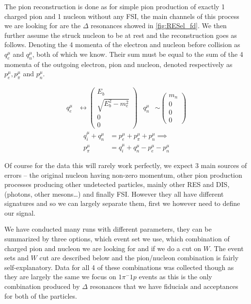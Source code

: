 \documentclass[a4paper,12pt]{article}
\begin{document}
The pion reconstruction is done as for simple pion production of exactly 1 charged pion and 1 nucleon without any FSI, the main channels of this process we are looking for are the $\Delta$ resonances showed in \cref{fig:RESel_fd}.
We then further assume the struck nucleon to be at rest and the reconstruction goes as follows.
Denoting the 4 momenta of the electron and nucleon before collision as $q_e^\mu$ and $q_n^\mu$, both of which we know.
Their sum must be equal to the sum of the 4 momenta of the outgoing electron, pion and nucleon, denoted respectively as $p_e^\mu, p_\pi^\mu$ and $p_n^\mu$.

\begin{align}\label{eq:reco_ass}
    q_e^\mu &\leftrightarrow \begin{pmatrix} E_b \\ \sqrt{E_b^2 - m_e^2} \\ 0 \\ 0 \end{pmatrix} &
    q_n^\mu &\sim \begin{pmatrix} m_n \\ 0 \\ 0 \\ 0 \end{pmatrix}
\end{align}
\begin{align}\label{eq:reco_res}
    q_i^\mu + q_n^\mu &= p_e^\mu + p_\pi^\mu + p_n^\mu \implies \nonumber \\
    p_\pi^\mu &= q_i^\mu + q_n^\mu - p_e^\mu - p_n^\mu
\end{align}

Of course for the data this will rarely work perfectly, we expect 3 main sources of errors -- the original nucleon having non-zero momentum, other pion production processes producing other undetected particles, mainly other RES and DIS, (photons, other mesons\ldots) and finally FSI.
However they all have different signatures and so we can largely separate them, first we however need to define our signal.

We have conducted many runs with different parameters, they can be summarized by three options, which event set we use, which combination of charged pion and nucleon we are looking for and if we do a cut on $W$.
The event sets and $W$ cut are described below and the pion/nucleon combination is fairly self-explanatory.
Data for all 4 of these combinations was collected though as they are largely the same we focus on $1\pi^-1p$ events as this is the only combination produced by $\Delta$ resonances that we have fiducials and acceptances for both of the particles.
\end{document}
